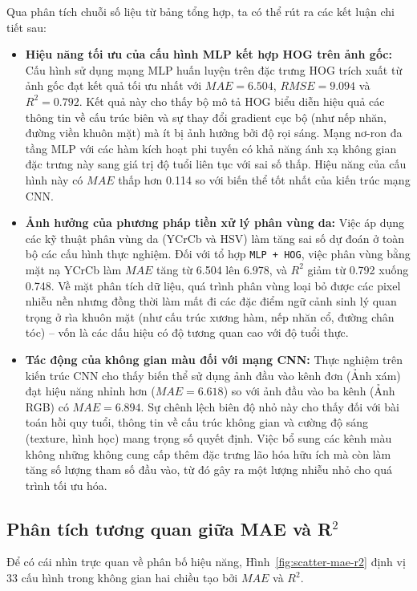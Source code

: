 Qua phân tích chuỗi số liệu từ bảng tổng hợp, ta có thể rút ra các kết luận chi tiết sau:
\begin{itemize}
    \item \textbf{Hiệu năng tối ưu của cấu hình MLP kết hợp HOG trên ảnh gốc:} Cấu hình sử dụng mạng MLP huấn luyện trên đặc trưng HOG trích xuất từ ảnh gốc đạt kết quả tối ưu nhất với $MAE = 6.504$, $RMSE = 9.094$ và $R^2 = 0.792$. Kết quả này cho thấy bộ mô tả HOG biểu diễn hiệu quả các thông tin về cấu trúc biên và sự thay đổi gradient cục bộ (như nếp nhăn, đường viền khuôn mặt) mà ít bị ảnh hưởng bởi độ rọi sáng. Mạng nơ-ron đa tầng MLP với các hàm kích hoạt phi tuyến có khả năng ánh xạ không gian đặc trưng này sang giá trị độ tuổi liên tục với sai số thấp. Hiệu năng của cấu hình này có $MAE$ thấp hơn 0.114 so với biến thể tốt nhất của kiến trúc mạng CNN.
    
    \item \textbf{Ảnh hưởng của phương pháp tiền xử lý phân vùng da:} Việc áp dụng các kỹ thuật phân vùng da (YCrCb và HSV) làm tăng sai số dự đoán ở toàn bộ các cấu hình thực nghiệm. Đối với tổ hợp \texttt{MLP + HOG}, việc phân vùng bằng mặt nạ YCrCb làm $MAE$ tăng từ 6.504 lên 6.978, và $R^2$ giảm từ 0.792 xuống 0.748. Về mặt phân tích dữ liệu, quá trình phân vùng loại bỏ được các pixel nhiễu nền nhưng đồng thời làm mất đi các đặc điểm ngữ cảnh sinh lý quan trọng ở rìa khuôn mặt (như cấu trúc xương hàm, nếp nhăn cổ, đường chân tóc) – vốn là các dấu hiệu có độ tương quan cao với độ tuổi thực.
    
    \item \textbf{Tác động của không gian màu đối với mạng CNN:} Thực nghiệm trên kiến trúc CNN cho thấy biến thể sử dụng ảnh đầu vào kênh đơn (Ảnh xám) đạt hiệu năng nhỉnh hơn ($MAE = 6.618$) so với ảnh đầu vào ba kênh (Ảnh RGB) có $MAE = 6.894$. Sự chênh lệch biên độ nhỏ này cho thấy đối với bài toán hồi quy tuổi, thông tin về cấu trúc không gian và cường độ sáng (texture, hình học) mang trọng số quyết định. Việc bổ sung các kênh màu không những không cung cấp thêm đặc trưng lão hóa hữu ích mà còn làm tăng số lượng tham số đầu vào, từ đó gây ra một lượng nhiễu nhỏ cho quá trình tối ưu hóa.
\end{itemize}

\subsection{Phân tích tương quan giữa MAE và R$^2$}
Để có cái nhìn trực quan về phân bố hiệu năng, Hình~\ref{fig:scatter-mae-r2} định vị 33 cấu hình trong không gian hai chiều tạo bởi $MAE$ và $R^2$. 

